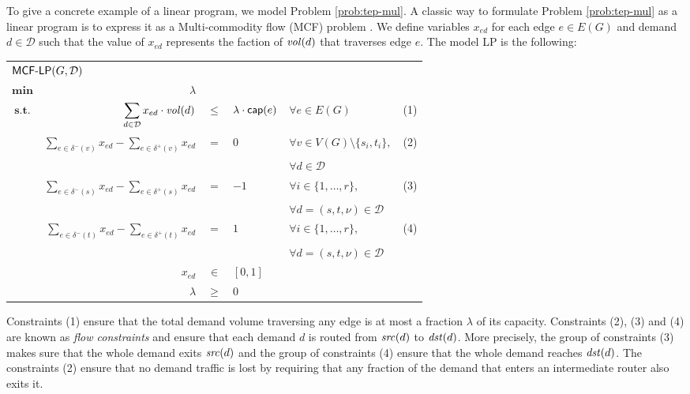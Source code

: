 
To give a concrete example of a linear program, we model Problem \ref{prob:tep-mul}. A classic way to formulate Problem 
\ref{prob:tep-mul} as a linear program is to express it as a Multi-commodity flow (MCF) problem \cite{steven}.
We define variables $x_{ed}$ for each edge $e \in E(G)$ and demand $d \in \mathcal{D}$ such that the value of $x_{ed}$ represents the faction
of $\mathit{vol}(d)$ that traverses edge $e$. The model LP is the following:

\begin{center}
\begin{tabular}{crcllr}
\multicolumn{5}{l}{$\textsf{MCF-LP}(G, \mathcal{D})$} \\[0.5cm] 
$\displaystyle \mathbf{min}$ & $\lambda$ & & & & \\[0.5cm]
$\textbf{s.t.}$ & $\displaystyle \sum_{d \in \mathcal{D}} x_{ed} \cdot \mathit{vol}(d)$                               & $\leq$ & $\lambda \cdot \mathsf{cap}(e)$ & $\forall e \in E(G)$ & (1) \\[0.5cm]
                & $\displaystyle \sum_{e \in \delta^-(v)} x_{ed} - \sum_{e \in \delta^+(v)} x_{ed}$ & $=$    & $ 0$ & $\forall v \in V(G) \setminus \{ s_i, t_i \},$  & (2) \\[-0.2cm]
                &  &  &  & $\forall d \in \mathcal{D}$ \\[0.5cm]
                & $\displaystyle \sum_{e \in \delta^-(s)} x_{ed} - \sum_{e \in \delta^+(s)} x_{ed}$ & $=$    & $-1$ & $\forall i \in \{ 1, \ldots, r \},$ & (3) \\[-0.2cm]
                &  &  &  & $\forall d = (s, t, \nu) \in \mathcal{D}$ \\[0.5cm]
                & $\displaystyle \sum_{e \in \delta^-(t)} x_{ed} - \sum_{e \in \delta^+(t)} x_{ed}$ & $=$    &  $1$ & $\forall i \in \{ 1, \ldots, r \},$ & (4) \\[-0.2cm] 
                &  &  &  & $\forall d = (s, t, \nu) \in \mathcal{D}$ \\[0.5cm]
                & $x_{ed}$ & $\in$ & $[0, 1]$ \\[0.5cm]
                & $\lambda$ & $\geq$ & $0$
\end{tabular}
\end{center}

Constraints (1) ensure that the total demand volume traversing any edge is at most a fraction $\lambda$ of its capacity. Constraints (2), (3) and (4) are known
as \emph{flow constraints} and ensure that each demand $d$ is routed from $\mathit{src}(d)$ to $\mathit{dst}(d)$. More precisely, the group of constraints (3) makes sure that the whole
demand exits $\mathit{src}(d)$ and the group of constraints (4) ensure that the whole demand reaches $\mathit{dst}(d)$. The constraints (2) ensure that no demand traffic is lost by
requiring that any fraction of the demand that enters an intermediate router also exits it.

